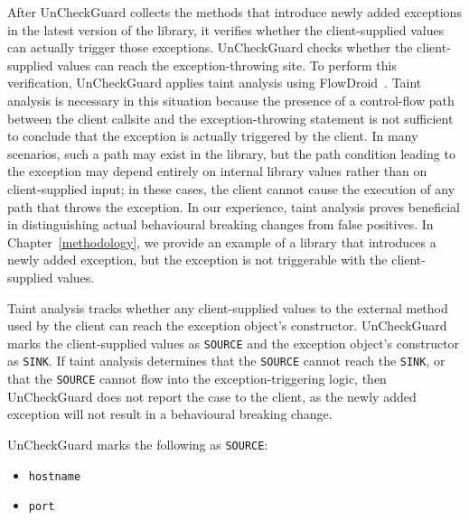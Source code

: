 After UnCheckGuard collects the methods that introduce newly added exceptions in the latest version of the library, it verifies whether the client-supplied values can actually trigger those exceptions. UnCheckGuard checks whether the client-supplied values can reach the exception-throwing site. To perform this verification, UnCheckGuard applies taint analysis using FlowDroid~\cite{Arzt14:_flowdroid}. Taint analysis is necessary in this situation because the presence of a control-flow path between the client callsite and the exception-throwing statement is not sufficient to conclude that the exception is actually triggered by the client. In many scenarios, such a path may exist in the library, but the path condition leading to the exception may depend entirely on internal library values rather than on client-supplied input; in these cases, the client cannot cause the execution of any path that throws the exception. In our experience, taint analysis proves beneficial in distinguishing actual behavioural breaking changes from false positives. In Chapter~\ref{methodology}, we provide an example of a library that introduces a newly added exception, but the exception is not triggerable with the client-supplied values.



Taint analysis tracks whether any client-supplied values to the external method used by the client can reach the exception object's constructor. UnCheckGuard marks the client-supplied values as \texttt{SOURCE} and the exception object's constructor as \texttt{SINK}. If taint analysis determines that the \texttt{SOURCE} cannot reach the \texttt{SINK}, or that the \texttt{SOURCE} cannot flow into the exception-triggering logic, then UnCheckGuard does not report the case to the client, as the newly added exception will not result in a behavioural breaking change.

UnCheckGuard marks the following as \texttt{SOURCE}:
\begin{itemize}
  \item \texttt{hostname}
  \item \texttt{port}
\end{itemize}

